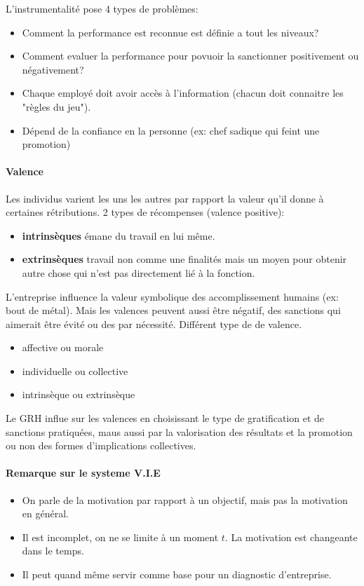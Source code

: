 \documentclass[11pt]{article} %
\begin{document}
		L'instrumentalité pose 4 types de problèmes:
		 \begin{itemize}
		 	\item Comment la performance est reconnue est définie a tout les niveaux? 
		 	\item Comment evaluer la performance pour povuoir la sanctionner positivement ou négativement?
		 	\item Chaque employé doit avoir accès à l'information (chacun doit connaitre les "règles du jeu").
		 	\item Dépend de la confiance en la personne (ex: chef sadique qui feint une promotion)
		 \end{itemize}
		 
		 \paragraph{Valence} Les individus varient les uns les autres par rapport la valeur qu'il donne à 
		 certaines rétributions. 2 types de récompenses (valence positive):
		 \begin{itemize}
		 	\item \textbf{intrinsèques} émane du travail en lui même.
		 	\item \textbf{extrinsèques} travail non comme une finalités mais un moyen pour obtenir autre 
		 	chose qui n'est pas directement lié à la fonction.
		 \end{itemize}
		 L'entreprise influence la valeur symbolique des accomplissement humains (ex: bout de métal). Mais les
		 valences peuvent aussi être négatif, des sanctions qui aimerait être évité ou des par nécessité. 
		 Différent type de de valence.
		 \begin{multicols}{2}
		 	\begin{itemize}
		 		\item affective ou morale
		 		\item individuelle ou collective
		 		\item intrinsèque ou extrinsèque
		 	\end{itemize}
		 \end{multicols}
		Le GRH influe sur les valences en choisissant le type de gratification et de sanctions pratiquées, maus aussi par la valorisation des résultats et la promotion ou non des formes d'implications collectives.
		 \paragraph{Remarque sur le systeme V.I.E}
		 \begin{itemize}
		 	\item On parle de la motivation par rapport à un objectif, mais pas la motivation en général.
		 	\item Il est incomplet, on ne se limite à un moment $t$. La motivation est changeante dans le temps.
		 	\item Il peut quand même servir comme base pour un diagnostic d'entreprise.
		 \end{itemize}
\end{document}
